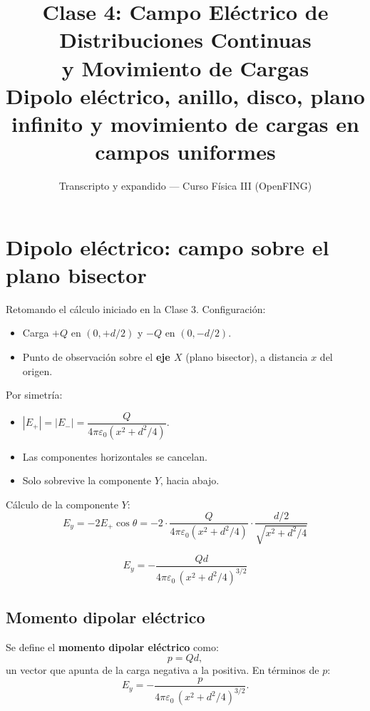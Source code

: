 \documentclass[12pt,a4paper]{article}
\title{\textbf{Clase 4: Campo Eléctrico de Distribuciones Continuas \\
        y Movimiento de Cargas}\\[0.3em]
        \large{Dipolo eléctrico, anillo, disco, plano infinito y
              movimiento de cargas en campos uniformes}}
\author{Transcripto y expandido --- Curso Física III (OpenFING)}
\date{}
\begin{document}
\maketitle
\thispagestyle{empty}
\newpage

\tableofcontents
\newpage

\section{Dipolo eléctrico: campo sobre el plano bisector}

Retomando el cálculo iniciado en la Clase 3. Configuración:
\begin{itemize}[nosep]
  \item Carga $+Q$ en $(0, +d/2)$ y $-Q$ en $(0, -d/2)$.
  \item Punto de observación sobre el \textbf{eje $X$} (plano
        bisector), a distancia $x$ del origen.
\end{itemize}

Por simetría:
\begin{itemize}[nosep]
  \item $|E_+| = |E_-| =
        \dfrac{Q}{4\pi\varepsilon_0 (x^{2} + d^{2}/4)}$.
  \item Las componentes horizontales se cancelan.
  \item Solo sobrevive la componente $Y$, hacia abajo.
\end{itemize}

Cálculo de la componente $Y$:
\[
E_y = -2 E_+ \cos\theta
     = -2 \cdot \frac{Q}{4\pi\varepsilon_0 (x^{2} + d^{2}/4)}
       \cdot \frac{d/2}{\sqrt{x^{2} + d^{2}/4}}
\]

\begin{keybox}
  \[
  \boxed{
  E_y = -\frac{Qd}{4\pi\varepsilon_0 \,(x^{2} + d^{2}/4)^{3/2}}
  }
  \]
\end{keybox}

\subsection{Momento dipolar eléctrico}

Se define el \textbf{momento dipolar eléctrico} como:
\[
\boxed{p = Qd},
\]
un vector que apunta de la carga negativa a la positiva. En términos
de $p$:
\[
E_y = -\frac{p}{4\pi\varepsilon_0 \,(x^{2} + d^{2}/4)^{3/2}}.
\]
\end{document}
